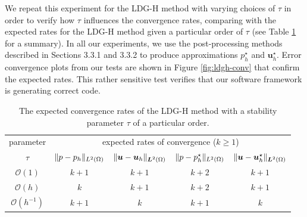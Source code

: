 \documentclass[a4paper]{article}
\DeclarePairedDelimiter\norm{\lVert}{\rVert}
\begin{document}
We repeat this experiment for the LDG-H method with varying choices of $\tau$
in order to verify how $\tau$ influences the convergence rates, comparing with the
expected rates for the LDG-H method given a particular order of $\tau$
(see Table \ref{table:ldg-h-rates} for a summary).
In all our experiments, we use the post-processing methods described in Sections
3.3.1 and 3.3.2 to produce approximations $p_h^\star$ and $\boldsymbol{u}_h^\star$.
Error convergence plots from our tests are shown in Figure \ref{fig:ldgh-conv} that confirm the expected
rates. This rather sensitive test verifies that our software framework is generating correct code.
\begin{table}[!htbp]
	\centering
	\caption{The expected convergence rates of the LDG-H method with a
		stability parameter $\tau$ of a particular order.}
	\begin{tabular}{ccccc}
		\hline
		parameter &
		\multicolumn{4}{c}{expected rates of convergence ($k \geq 1$)} \\
		\cline{2-5}
		$\tau$ & $\norm{p - p_h}_{L^2(\Omega)}$ &
		$\norm{\boldsymbol{u} - \boldsymbol{u}_h}_{\boldsymbol{L}^2(\Omega)}$ &
		$\norm{p - p^\star_h}_{L^2(\Omega)}$ &
		$\norm{\boldsymbol{u} - \boldsymbol{u}^\star_h}_{\boldsymbol{L}^2(\Omega)}$ \\
		\hline
		$\mathcal{O}(1)$ & $k+1$ & $k+1$ & $k+2$ & $k+1$ \\
		\hline
		$\mathcal{O}(h)$ & $k$ & $k+1$ & $k+2$ & $k+1$ \\
		\hline
		$\mathcal{O}\left(h^{-1}\right)$ & $k+1$ & $k$ & $k+1$ & $k$ \\
		\hline
	\end{tabular}
	\label{table:ldg-h-rates}
\end{table}
\end{document}
